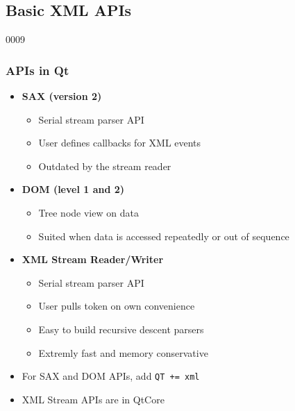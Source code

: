 %
%
%
%

\subsection{Basic XML APIs}


\begin{slide}[fragile]{0009}
\frametitle{ APIs in Qt} \label{xml}
\begin{itemize}
\item \textbf{SAX (version 2)}
  \begin{itemize}
  \item Serial stream parser API
  \item User defines callbacks for XML events
  \item Outdated by the stream reader
  \end{itemize}
\item\textbf{ DOM (level 1 and 2)}
  \begin{itemize}
  \item Tree node view on data
  \item Suited when data is accessed repeatedly or out of sequence 
  \end{itemize}
\item \textbf{XML Stream Reader/Writer}
  \begin{itemize}
  \item Serial stream parser API
  \item User pulls token on own convenience
  \item Easy to build recursive descent parsers
  \item Extremly fast and memory conservative
  \end{itemize}
\item For SAX and DOM APIs, add \verb!QT += xml!
\item XML Stream APIs are in QtCore
\end{itemize}
\end{slide}

